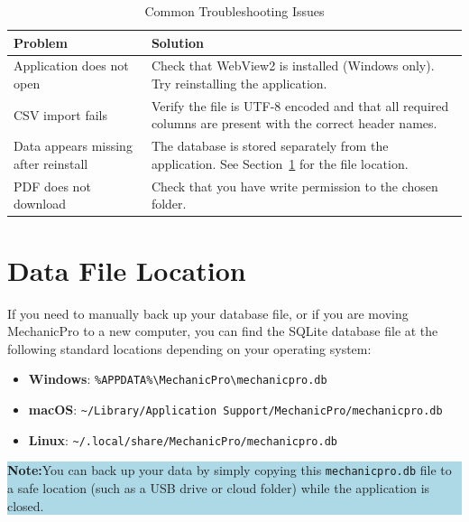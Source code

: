 \documentclass[12pt, a4paper]{report}
\newcommand{\notebox}[1]{%
	\vspace{6pt}
	\noindent
	\colorbox{LightBlue}{%
		\begin{minipage}{\dimexpr\linewidth-2\fboxsep}%
			\vspace{5pt}
			\small\textbf{\color{Blue}Note:\space}\color{Navy}#1
			\vspace{5pt}
		\end{minipage}%
	}
	\vspace{6pt}
}
\begin{document}
	\begin{table}[H]
		\centering
		\caption{Common Troubleshooting Issues}
		\label{tab:common_issues}
		\begin{tabularx}{\textwidth}{l X}
			\toprule
			\textbf{Problem} & \textbf{Solution} \\
			\midrule
			Application does not open
			& Check that WebView2 is installed (Windows only).
			Try reinstalling the application. \\
			\addlinespace
			CSV import fails
			& Verify the file is UTF-8 encoded and that all required
			columns are present with the correct header names. \\
			\addlinespace
			Data appears missing after reinstall
			& The database is stored separately from the application.
			See Section~\ref{sec:dataLocation} for the file location. \\
			\addlinespace
			PDF does not download
			& Check that you have write permission to the chosen folder. \\
			\bottomrule
		\end{tabularx}
	\end{table}
	
	\section{Data File Location}
	\label{sec:dataLocation}
	If you need to manually back up your database file, or if you are moving MechanicPro to a new computer, you can find the SQLite database file at the following standard locations depending on your operating system:
	
	\begin{itemize}
		\item \textbf{Windows}: \texttt{\%APPDATA\%\textbackslash{}MechanicPro\textbackslash{}mechanicpro.db}
		\item \textbf{macOS}: \texttt{\textasciitilde{}/Library/Application Support/MechanicPro/mechanicpro.db}
		\item \textbf{Linux}: \texttt{\textasciitilde{}/.local/share/MechanicPro/mechanicpro.db}
	\end{itemize}
	
	\notebox{You can back up your data by simply copying this \texttt{mechanicpro.db} file to a safe location (such as a USB drive or cloud folder) while the application is closed.}
	
	\appendix
	
\end{document}
